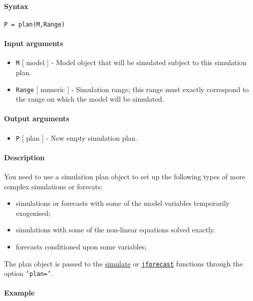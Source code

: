 


	\paragraph{Syntax}

\begin{verbatim}
P = plan(M,Range)
\end{verbatim}

\paragraph{Input arguments}

\begin{itemize}
\item
  \texttt{M} {[} model {]} - Model object that will be simulated subject
  to this simulation plan.
\item
  \texttt{Range} {[} numeric {]} - Simulation range; this range must
  exactly correspond to the range on which the model will be simulated.
\end{itemize}

\paragraph{Output arguments}

\begin{itemize}
\itemsep1pt\parskip0pt
\item
  \texttt{P} {[} plan {]} - New empty simulation plan.
\end{itemize}

\paragraph{Description}

You need to use a simulation plan object to set up the following types
of more complex simulations or forecats:

\begin{itemize}
\item
  simulations or forecasts with some of the model variables temporarily
  exogenised;
\item
  simulations with some of the non-linear equations solved exactly.
\item
  forecasts conditioned upon some variables;
\end{itemize}

The plan object is passed to the \href{model/simulate}{simulate} or
\href{model/jforecast}{\texttt{jforecast}} functions through the option
\texttt{'plan='}.

\paragraph{Example}


